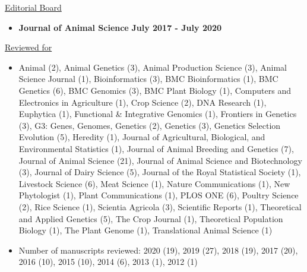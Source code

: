 \documentclass[margin,line,10pt]{res}
\newenvironment{list1}{
  \begin{list}{\ding{113}}{%
      \setlength{\itemsep}{0in}
      \setlength{\parsep}{0in} \setlength{\parskip}{0in}
      \setlength{\topsep}{0in} \setlength{\partopsep}{0in} 
      \setlength{\leftmargin}{0.17in}}}{\end{list}}
\begin{document}
\begin{resume}
\underline{Editorial Board}
 \vspace{.2cm}
\begin{itemize}
\item {\bf Journal of Animal Science} \hfill  {\bf July 2017 - July 2020} 
\end{itemize}
  
\vspace{0.3cm}
\underline{Reviewed for}
\begin{itemize}
    \vspace{.1cm}
\item Animal (2), Animal Genetics (3), Animal Production Science (3), Animal Science Journal (1), Bioinformatics (3), BMC Bioinformatics (1), BMC Genetics (6), BMC Genomics (3), BMC Plant Biology (1), Computers and Electronics in Agriculture (1), Crop Science (2), DNA Research (1),  Euphytica (1), Functional \& Integrative Genomics (1), Frontiers in Genetics (3), G3: Genes, Genomes, Genetics (2), Genetics (3), Genetics Selection Evolution (5), Heredity (1), Journal of Agricultural, Biological, and Environmental Statistics (1), Journal of Animal Breeding and Genetics (7), Journal of Animal Science (21), Journal of Animal Science and Biotechnology (3), Journal of Dairy Science (5), Journal of the Royal Statistical Society (1), Livestock Science (6), Meat Science (1), Nature Communications (1), New Phytologist (1), Plant Communications (1), PLOS ONE (6), Poultry Science (2), Rice Science (1), Scientia Agricola (3), Scientific Reports (1), Theoretical and Applied Genetics (5), The Crop Journal (1), Theoretical Population Biology (1), The Plant Genome (1), Translational Animal Science (1)  
  \vspace{.1cm}
  \item Number of manuscripts reviewed: 2020 (19), 2019 (27), 2018 (19), 2017 (20), 2016 (10), 2015 (10), 2014 (6), 2013 (1), 2012 (1)
\end{itemize}

\begin{comment}
\vspace{0.5cm}
\section{\sc Manuscripts under review}

\begin{list1}

        \item [{\bf 30}.] Mota LFM, Pegolo S, Baba T, \textbf{\underline{Morota G}}, Pe\~{n}agaricano F, Bittante G, and Cecchinato A. Design of multi-breed training population for Fourier- transform infrared predictions in Holstein cows \emph{hoge}. 


\end{comment}
\end{resume}
\end{document}

